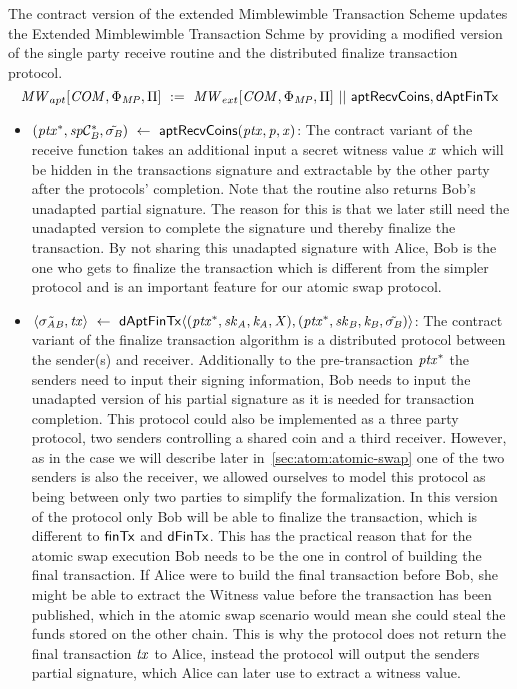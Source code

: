 \begin{definition}
    \label{def:atom:apt-ext-mw-tx-scheme}
    The contract version of the extended Mimblewimble Transaction Scheme updates the Extended Mimblewimble Transaction Schme by providing a modified version of the single party receive routine and the distributed finalize transaction protocol.
    \[ \mathit{MW}_{apt}[\mathit{COM},\Phi_{\mathit{MP}},\Pi] ~:=~ \mathit{MW}_{ext}[\mathit{COM},\Phi_{\mathit{MP}},\Pi] ~||~ \mathsf{aptRecvCoins}, \mathsf{dAptFinTx} \]
    \begin{itemize}
        \item $(\mathit{ptx}^*, \mathit{sp}\mathcal{C}_{\mathit{B}}^*, \tilde{\sigma_{\mathit{B}}}) ~\leftarrow~ \mathsf{aptRecvCoins}(\mathit{ptx},\mathit{p},\mathit{x})$: The contract variant of the receive function takes an additional input a secret witness value
        $\mathit{x}$ which will be hidden in the transactions signature and extractable by the other party after the protocols' completion.
        Note that the routine also returns Bob's unadapted partial signature.
        The reason for this is that we later still need the unadapted version to complete the signature und thereby finalize the transaction.
        By not sharing this unadapted signature with Alice, Bob is the one who gets to finalize the transaction which is different from the simpler protocol and is an important feature for our atomic swap protocol.
        \item $\langle \tilde{\sigma_{\mathit{A}\mathit{B}}}, \mathit{tx} \rangle ~\leftarrow~ \mathsf{dAptFinTx} \langle (\mathit{ptx}^*,\mathit{sk}_{\mathit{A}},\mathit{\mathit{k}_{\mathit{A}}},\mathit{X}), (\mathit{ptx}^*,\mathit{sk}_{\mathit{B}},\mathit{\mathit{k}_{\mathit{B}}},\tilde{\sigma_{\mathit{B}}}) \rangle$: The contract variant of the finalize transaction algorithm is a distributed protocol between the sender(s) and receiver.
        Additionally to the pre-transaction $\mathit{ptx}^*$ the senders need to input their signing information, Bob needs to input the unadapted version of his partial signature as it is needed for transaction completion.
        This protocol could also be implemented as a three party protocol, two senders controlling a shared coin and a third receiver.
        However, as in the case we will describe later in~\ref{sec:atom:atomic-swap} one of the two senders is also the receiver, we allowed ourselves to model this protocol as being between only two parties to simplify the formalization.
        In this version of the protocol only Bob will be able to finalize the transaction, which is different to $\mathsf{finTx}$ and $\mathsf{dFinTx}$.
        This has the practical reason that for the atomic swap execution Bob needs to be the one in control of building the final transaction.
        If Alice were to build the final transaction before Bob, she might be able to extract the Witness value before the transaction has been published, which in the atomic swap scenario would mean she could steal the funds stored on the other chain.
        This is why the protocol does not return the final transaction $\mathit{tx}$ to Alice, instead the protocol will output the senders partial signature, which Alice can later use to extract a witness value.
    \end{itemize}
\end{definition}

